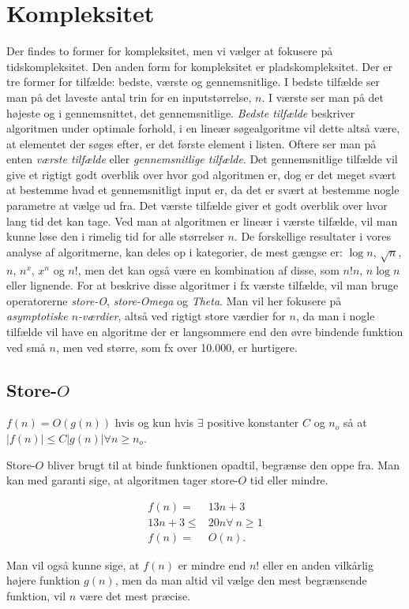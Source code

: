 \section{Kompleksitet} \label{kap:kompleksitet}

Der findes to former for kompleksitet, men vi vælger at fokusere på tidskompleksitet. Den anden form for kompleksitet er pladskompleksitet. 
Der er tre former for tilfælde: bedste, værste og gennemsnitlige. 
I bedste tilfælde ser man på det laveste antal trin for en inputstørrelse, $n$. I værste ser man på det højeste og i gennemsnittet, det gennemsnitlige. 
\emph{Bedste tilfælde} beskriver algoritmen under optimale forhold, i en lineær søgealgoritme vil dette altså være, at elementet der søges efter, er det første element i listen. 
Oftere ser man på enten \emph{værste tilfælde} eller \emph{gennemsnitlige tilfælde}. 
Det gennemsnitlige tilfælde vil give et rigtigt godt overblik over hvor god algoritmen er, dog er det meget svært at bestemme hvad et gennemsnitligt input er, da det er svært at bestemme nogle parametre at vælge ud fra. 
Det værste tilfælde giver et godt overblik over hvor lang tid det kan tage. Ved man at algoritmen er lineær i værste tilfælde, vil man kunne løse den i rimelig tid for alle størrelser $n$.
De forskellige resultater i vores analyse af algoritmerne, kan deles op i kategorier, de mest gængse er: $\log n$, $\sqrt{n}$, $n$, $n^x$, $x^n$ og $n!$, men det kan også være en kombination af disse, som $n!n$, $n\log n$ eller lignende.
For at beskrive disse algoritmer i fx værste tilfælde, vil man bruge operatorerne \emph{store-O}, \emph{store-Omega} og \emph{Theta}. Man vil her fokusere på \emph{asymptotiske $n$-værdier}, altså ved rigtigt store værdier for $n$, da man i nogle tilfælde vil have en algoritme der er langsommere end den øvre bindende funktion ved små $n$, men ved større, som fx over 10.000, er hurtigere.

\subsection{Store-$O$}
\begin{defn}
$f(n)= O(g(n))$ hvis og kun hvis $\exists$ positive konstanter $C$ og $n_o$ så at $|f(n)| \leq C |g(n)| \forall n \geq n_o$.
\end{defn}

Store-$O$ bliver brugt til at binde funktionen opadtil, begrænse den oppe fra. Man kan med garanti sige, at algoritmen tager store-$O$ tid eller mindre. 
\begin{exmp}
\begin{align*}
f(n)=& 13n+3 \\
13n+3 \leq& 20n \forall \ n \geq 1 \\
f(n) =& O(n).
\end{align*}
\end{exmp}
Man vil også kunne sige, at $f(n)$ er mindre end $n!$ eller en anden vilkårlig højere funktion $g(n)$, men da man altid vil vælge den mest begrænsende funktion, vil $n$ være det mest præcise. 

